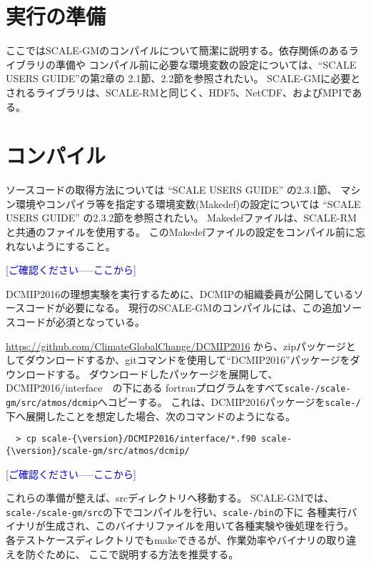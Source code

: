 \section{実行の準備}
ここではSCALE-GMのコンパイルについて簡潔に説明する。依存関係のあるライブラリの準備や
コンパイル前に必要な環境変数の設定については、``SCALE USERS GUIDE''の第2章の
2.1節、2.2節を参照されたい。
SCALE-GMに必要とされるライブラリは、SCALE-RMと同じく、HDF5、NetCDF、およびMPIである。

\section{コンパイル}
ソースコードの取得方法については ``SCALE USERS GUIDE'' の2.3.1節、
マシン環境やコンパイラ等を指定する環境変数(Makedef)の設定については
 ``SCALE USERS GUIDE'' の2.3.2節を参照されたい。
Makedefファイルは、SCALE-RMと共通のファイルを使用する。
このMakedefファイルの設定をコンパイル前に忘れないようにすること。

\textcolor{blue}{[ご確認ください-----ここから]}

DCMIP2016の理想実験を実行するために、DCMIPの組織委員が公開しているソースコードが必要になる。
現行のSCALE-GMのコンパイルには、この追加ソースコードが必須となっている。

\url{https://github.com/ClimateGlobalChange/DCMIP2016}
から、zipパッケージとしてダウンロードするか、gitコマンドを使用して``DCMIP2016''パッケージをダウンロードする。
ダウンロードしたパッケージを展開して、DCMIP2016/interface　の下にある
fortranプログラムをすべて\texttt{scale-{\version}/scale-gm/src/atmos/dcmip}へコピーする。
これは、DCMIP2016パッケージを\texttt{scale-{\version}/}下へ展開したことを想定した場合、次のコマンドのようになる。
\begin{verbatim}
  > cp scale-{\version}/DCMIP2016/interface/*.f90 scale-{\version}/scale-gm/src/atmos/dcmip/
\end{verbatim}

\textcolor{blue}{[ご確認ください-----ここから]}

これらの準備が整えば、srcディレクトリへ移動する。
SCALE-GMでは、\texttt{scale-{\version}/scale-gm/src}の下でコンパイルを行い、\texttt{scale-{\version}/bin}の下に
各種実行バイナリが生成され、このバイナリファイルを用いて各種実験や後処理を行う。
各テストケースディレクトリでもmakeできるが、作業効率やバイナリの取り違えを防ぐために、
ここで説明する方法を推奨する。


